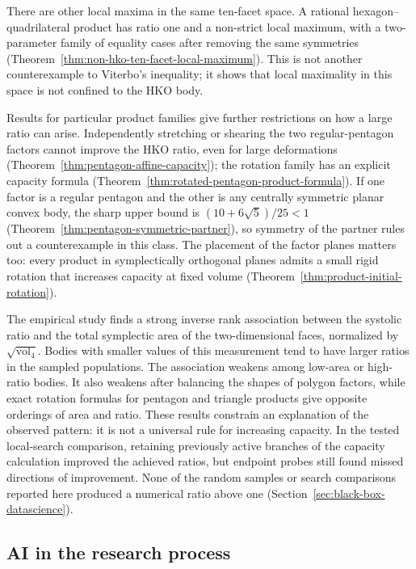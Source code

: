 There are other local maxima in the same ten-facet space. A rational
hexagon--quadrilateral product has ratio one and a non-strict local
maximum, with a two-parameter family of equality cases after removing the
same symmetries (Theorem~\ref{thm:non-hko-ten-facet-local-maximum}). This
is not another counterexample to Viterbo's inequality; it shows that local
maximality in this space is not confined to the HKO body.

Results for particular product families give further restrictions on how
a large ratio can arise. Independently stretching or shearing the two
regular-pentagon factors cannot improve the HKO ratio, even for large
deformations (Theorem~\ref{thm:pentagon-affine-capacity}); the rotation
family has an explicit capacity formula
(Theorem~\ref{thm:rotated-pentagon-product-formula}). If one factor is a
regular pentagon and the other is any centrally symmetric planar convex
body, the sharp upper bound is $(10+6\sqrt5)/25<1$
(Theorem~\ref{thm:pentagon-symmetric-partner}), so symmetry of the partner
rules out a counterexample in this class. The placement of the factor
planes matters too: every product in symplectically orthogonal planes
admits a small rigid rotation that increases capacity at fixed volume
(Theorem~\ref{thm:product-initial-rotation}).

The empirical study finds a strong inverse rank association between the
systolic ratio and the total symplectic area of the two-dimensional faces,
normalized by $\sqrt{\operatorname{vol}_4}$. Bodies with smaller values
of this measurement tend to have larger ratios in the sampled populations.
The association weakens among low-area or high-ratio bodies. It also
weakens after balancing the shapes of polygon factors, while exact
rotation formulas for pentagon and triangle products give opposite
orderings of area and ratio. These results constrain an explanation of
the observed pattern: it is not a universal rule for increasing capacity.
In the tested local-search comparison, retaining previously active
branches of the capacity calculation improved the achieved ratios, but
endpoint probes still found missed directions of improvement. None of the
random samples or search comparisons reported here produced a numerical
ratio above one (Section~\ref{sec:black-box-datascience}).

\subsection{AI in the research process}

